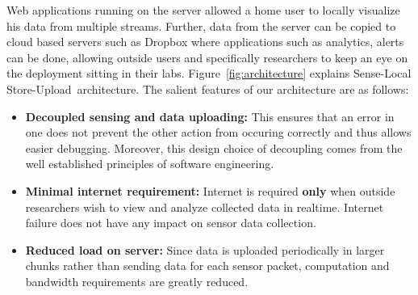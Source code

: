 \documentclass[10pt]{sensys-proc}
\newcommand{\figref}[1]{Figure~\ref{#1}}
\newcommand{\paradigms}{Sense-Local Store-Upload~}
\begin{document}
Web applications running on the server allowed a home user to locally visualize his data from multiple streams. Further, data from the server can be copied to cloud based servers such as Dropbox where applications such as analytics, alerts can be done, allowing outside users and specifically researchers to keep an eye on the deployment sitting in their labs. \figref{fig:architecture} explains \paradigms architecture. The salient features of our architecture are as follows:
\begin{itemize}
\item \textbf{Decoupled sensing and data uploading:} This ensures that an error in one does not prevent the other action from occuring correctly and thus allows easier debugging. Moreover, this design choice of decoupling comes from the well established principles of software engineering.
\item \textbf{Minimal internet requirement:} Internet is required \textbf{only} when outside researchers wish to view and analyze collected data in realtime. Internet failure does not have any impact on sensor data collection.
\item \textbf{Reduced load on server:} Since data is uploaded periodically in larger chunks rather than sending data for each sensor packet, computation and bandwidth requirements are greatly reduced.
\end{itemize}
\end{document}
